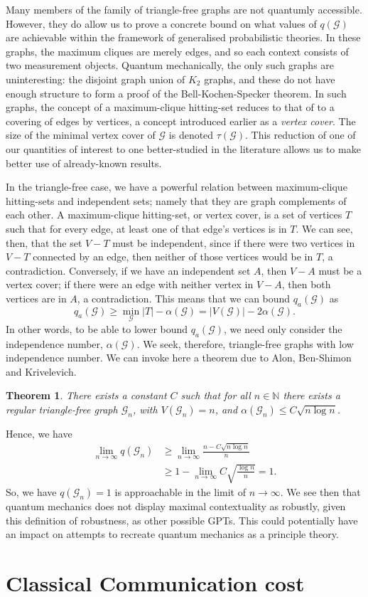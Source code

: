 \documentclass{amsart}
\newtheorem{thm}{Theorem}
\theoremstyle{definition}
\begin{document}
Many members of the family of triangle-free graphs are not quantumly accessible. However, they do allow us to prove a concrete bound on what values of $q(\mathcal{G})$ are achievable within the framework of generalised probabilistic theories. In these graphs, the maximum cliques are merely edges, and so each context consists of two measurement objects. Quantum mechanically, the only such graphs are uninteresting: the disjoint graph union of $K_2$ graphs, and these do not have enough structure to form a proof of the Bell-Kochen-Specker theorem. In such graphs, the concept of a maximum-clique hitting-set reduces to that of to a covering of edges by vertices, a concept introduced earlier as a \emph{vertex cover}. The size of the minimal vertex cover of $\mathcal{G}$ is denoted $\tau(\mathcal{G})$. This reduction of one of our quantities of interest to one better-studied in the literature allows us to make better use of already-known results.

In the triangle-free case, we have a powerful relation between maximum-clique hitting-sets and independent sets; namely that they are graph complements of each other. A maximum-clique hitting-set, or vertex cover, is a set of vertices $T$ such that for every edge, at least one of that edge's vertices is in $T$. We can see, then, that the set $V-T$ must be independent, since if there were two vertices in $V-T$ connected by an edge, then neither of those vertices would be in $T$, a contradiction. Conversely, if we have an independent set $A$, then $V-A$ must be a vertex cover; if there were an edge with neither vertex in $V-A$, then both vertices are in $A$, a contradiction. This means that we can bound $q_a(\mathcal{G})$ as
\begin{equation}
q_a(\mathcal{G})\geq \min_\mathcal{G} |T| - \alpha(\mathcal{G}) = |V(\mathcal{G})|-2\alpha(\mathcal{G}).
\end{equation}
In other words, to be able to lower bound $q_a(\mathcal{G})$, we need only consider the independence number, $\alpha(\mathcal{G})$. We seek, therefore, triangle-free graphs with low independence number. We can invoke here a theorem due to Alon, Ben-Shimon and Krivelevich.\cite{Alon2010}
\begin{thm}
There exists a constant $C$ such that for all $n\in\mathbb{N}$ there exists a regular triangle-free graph $\mathcal{G}_n$, with $V(\mathcal{G}_n)=n$, and $\alpha(\mathcal{G}_n)\leq C\sqrt{n\log n}$.
\end{thm}

Hence, we have
\begin{align}
\lim_{n\rightarrow\infty}q(\mathcal{G}_n)&\geq\lim_{n\rightarrow\infty}\frac{n-C\sqrt{n\log n}}{n}\\
&\geq 1-\lim_{n\rightarrow\infty}C\sqrt{\frac{\log n}{n}}=1.
\end{align}
So, we have $q(\mathcal{G}_n)=1$ is approachable in the limit of $n\rightarrow\infty$. We see then that quantum mechanics does not display maximal contextuality as robustly, given this definition of robustness, as other possible GPTs. This could potentially have an impact on attempts to recreate quantum mechanics as a principle theory.

\FloatBarrier
\section{Classical Communication cost}



{}

\end{document}
